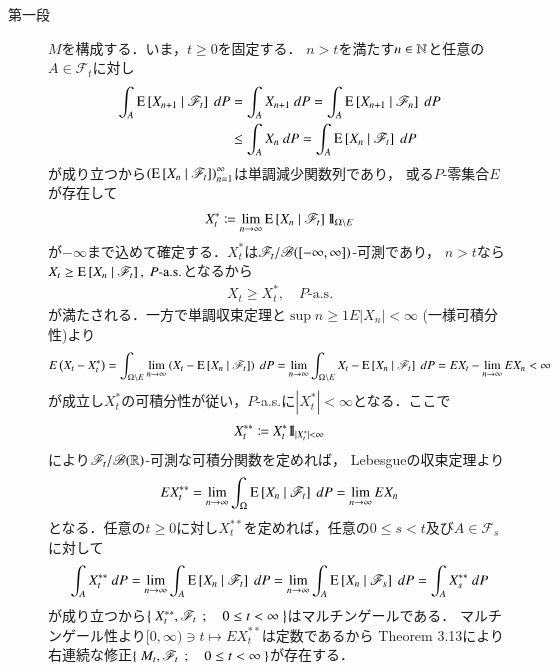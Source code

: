  	\begin{prf}\mbox{}
		\begin{description}
			\item[第一段] $M$を構成する．いま，$t \geq 0$を固定する．
				$n > t$を満たす$n \in \mathbb{N}$と任意の$A \in \mathscr{F}_t$に対し
 				\begin{align}
 					\int_A \operatorname{E} \left[ X_{n+1} \ \middle|\ \mathscr{F}_t \right]\ dP
 					&= \int_A X_{n+1}\ dP
 					= \int_A \operatorname{E} \left[ X_{n+1} \ \middle|\ \mathscr{F}_n \right]\ dP \\
		 			&\leq \int_A X_n\ dP
 					= \int_A \operatorname{E} \left[ X_n \ \middle|\ \mathscr{F}_t \right]\ dP
 				\end{align}
 				が成り立つから$\left( \operatorname{E} \left[ X_n \ \middle|\ \mathscr{F}_t \right] \right)_{n=1}^\infty$は単調減少関数列であり，
 				或る$P$-零集合$E$が存在して
 				\begin{align}
 					X^*_t \coloneqq \lim_{n \to \infty} \operatorname{E} \left[ X_n \ \middle|\ \mathscr{F}_t \right] \mbox{1}\hspace{-0.25em}\mbox{l}_{\Omega \backslash E}
 				\end{align}
 				が$-\infty$まで込めて確定する．$X^*_t$は$\mathscr{F}_t/\mathscr{B}([-\infty,\infty])$-可測であり，
 				$n > t$なら$X_t \geq \cexp{X_n}{\mathscr{F}_t},\ \mbox{$P$-a.s.}$となるから
 				\begin{align}
 					X_t \geq X^*_t, \quad \mbox{$P$-a.s.}
 				\end{align}
 				が満たされる．一方で単調収束定理と$\sup{n \geq 1}{E|X_n|} < \infty$ (一様可積分性)より
 				\begin{align}
 					E\left( X_t - X^*_t \right)
 					= \int_{\Omega \backslash E} \lim_{n \to \infty} \left( X_t - \operatorname{E} \left[ X_n \ \middle|\ \mathscr{F}_t \right] \right)\ dP
 					= \lim_{n \to \infty} \int_{\Omega \backslash E} X_t - \operatorname{E} \left[ X_n \ \middle|\ \mathscr{F}_t \right]\ dP
 					= E X_t - \lim_{n \to \infty} EX_n < \infty
 				\end{align}
 				が成立し$X^*_t$の可積分性が従い，$P$-a.s.に$|X^*_t| <\infty$となる．ここで
 				\begin{align}
 					X^{**}_t \coloneqq X^*_t \mbox{1}\hspace{-0.25em}\mbox{l}_{|X^*_t| < \infty}
 				\end{align}
 				により$\mathscr{F}_t/\mathscr{B}(\mathbb{R})$-可測な可積分関数を定めれば，
 				Lebesgueの収束定理より
 				\begin{align}
 					E X^{**}_t
 					= \lim_{n \to \infty} \int_\Omega \operatorname{E} \left[ X_n \ \middle|\ \mathscr{F}_t \right]\ dP
 					= \lim_{n \to \infty} E X_n
 					\label{eq:chapter_1_Exercise_3_18_1}
 				\end{align}
 				となる．任意の$t \geq 0$に対し$X^{**}_t$を定めれば，任意の$0 \leq s < t$及び$A \in \mathscr{F}_s$に対して
 				\begin{align}
 					\int_A X^{**}_t\ dP
 					= \lim_{n \to \infty} \int_A \operatorname{E} \left[ X_n \ \middle|\ \mathscr{F}_t \right]\ dP 
 					= \lim_{n \to \infty} \int_A \operatorname{E} \left[ X_n \ \middle|\ \mathscr{F}_s \right]\ dP
 					= \int_A X^{**}_s\ dP
 				\end{align}
 				が成り立つから$\left\{\ X^{**}_t,\mathscr{F}_t\ \, ; \quad 0 \leq t < \infty\ \right\}$はマルチンゲールである．
 				マルチンゲール性より$[0,\infty) \ni t \longmapsto EX^{**}_t$は定数であるから
 				Theorem 3.13により右連続な修正$\left\{\ M_t,\mathscr{F}_t\ \, ; \quad 0 \leq t < \infty\ \right\}$が存在する．
 		

\end{description}
\end{prf}
